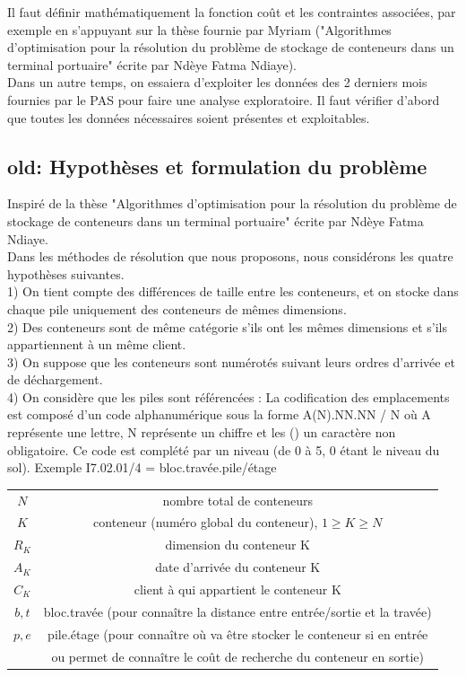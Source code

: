 \documentclass{article}
\begin{document}
Il faut définir mathématiquement la fonction coût et les contraintes associées, par exemple en s'appuyant sur la thèse fournie par Myriam ("Algorithmes d'optimisation pour la résolution du problème de stockage de conteneurs dans un terminal portuaire" écrite par Ndèye Fatma Ndiaye). \\

Dans un autre temps, on essaiera d'exploiter les données des 2 derniers mois fournies par le PAS pour faire une analyse exploratoire. Il faut vérifier d'abord que toutes les données nécessaires soient présentes et exploitables.



\subsection{old: Hypothèses et formulation du problème}

Inspiré de la thèse "Algorithmes d'optimisation pour la résolution du problème de stockage de conteneurs dans un terminal portuaire" écrite par Ndèye Fatma Ndiaye. \\


Dans les méthodes de résolution que nous proposons, nous considérons les quatre hypothèses suivantes. \\
1) On tient compte des différences de taille entre les conteneurs, et on stocke dans chaque pile uniquement des conteneurs de mêmes dimensions. \\
2) Des conteneurs sont de même catégorie s'ils ont les mêmes dimensions et s'ils appartiennent à un même client. \\
3) On suppose que les conteneurs sont numérotés suivant leurs ordres d'arrivée et de déchargement. \\
4) On considère que les piles sont référencées :
La codification des emplacements est composé d'un code alphanumérique sous la forme A(N).NN.NN / N
où A représente une lettre, N représente un chiffre et les () un caractère non obligatoire. Ce code est complété par un niveau (de 0 à 5, 0 étant le niveau du sol). Exemple I7.02.01/4 = bloc.travée.pile/étage



\begin{table}[h!]
\centering
 \begin{tabular}{|c|c|}
\hline
$N$ & nombre total de conteneurs \\
$K$ & conteneur (numéro global du conteneur), $1\ge K \ge N$ \\
$R_K$ & dimension du conteneur K \\
$A_K$ & date d'arrivée du conteneur K \\
$C_K$ & client à qui appartient le conteneur K \\
\hline
$b,t$ & bloc.travée (pour connaître la distance entre entrée/sortie et la travée) \\
$p,e$ & pile.étage (pour connaître où va être stocker le conteneur si en entrée \\
& ou permet de connaître le coût de recherche du conteneur en sortie) \\
\hline
\end{tabular}
\end{table}
\end{document}
